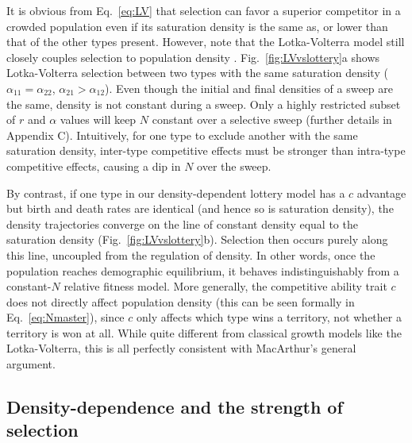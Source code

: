 \documentclass[11pt]{article}
\begin{document}
It is obvious from Eq.~\eqref{eq:LV} that selection can favor a superior competitor in a crowded population even if its saturation density is the same as, or lower than that of the other types present. However, note that the Lotka-Volterra model still closely couples selection to population density \citep{smouse_1976}. Fig.~\ref{fig:LVvslottery}a shows Lotka-Volterra selection between two types with the same saturation density ($\alpha_{11}=\alpha_{22}$, $\alpha_{21}>\alpha_{12}$). Even though the initial and final densities of a sweep are the same, density is not constant during a sweep. Only a highly restricted subset of $r$ and $\alpha$ values will keep $N$ constant over a selective sweep (further details in Appendix C). Intuitively, for one type to exclude another with the same saturation density, inter-type competitive effects must be stronger than intra-type competitive effects, causing a dip in $N$ over the sweep. 

By contrast, if one type in our density-dependent lottery model has a $c$ advantage but birth and death rates are identical (and hence so is saturation density), the density trajectories converge on the line of constant density equal to the saturation density (Fig.~\ref{fig:LVvslottery}b). Selection then occurs purely along this line, uncoupled from the regulation of density. In other words, once the population reaches demographic equilibrium, it behaves indistinguishably from a constant-$N$ relative fitness model. More generally, the competitive ability trait $c$ does not directly affect population density (this can be seen formally in Eq.~\eqref{eq:Nmaster}), since $c$ only affects which type wins a territory, not whether a territory is won at all. While quite different from classical growth models like the Lotka-Volterra, this is all perfectly consistent with MacArthur's general argument. 

\subsection*{Density-dependence and the strength of selection}
\end{document}
